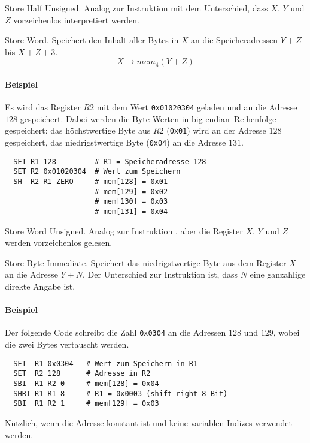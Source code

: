 \glqq Store Half Unsigned\grqq.
Analog zur Instruktion  mit dem Unterschied, dass $X$, $Y$ und $Z$
vorzeichenlos interpretiert werden.


\glqq Store Word\grqq.
Speichert den Inhalt aller Bytes in $X$ an die Speicheradressen $Y + Z$ bis 
$X + Z + 3$.
\[
    X \to mem_{4}(Y + Z)
\]
\paragraph{Beispiel}
Es wird das Register $R2$ mit dem Wert \texttt{0x01020304} geladen und an die
Adresse $128$ gespeichert. Dabei werden die Byte-Werten in 
\glqq big-endian\grqq\ Reihenfolge gespeichert: das höchstwertige Byte aus $R2$
(\texttt{0x01}) wird an der Adresse $128$ gespeichert, das niedrigstwertige
Byte (\texttt{0x04}) an die Adresse $131$.

\begin{lstlisting}
  SET R1 128         # R1 = Speicheradresse 128
  SET R2 0x01020304  # Wert zum Speichern
  SH  R2 R1 ZERO     # mem[128] = 0x01
                     # mem[129] = 0x02
                     # mem[130] = 0x03
                     # mem[131] = 0x04
\end{lstlisting}


\glqq Store Word Unsigned\grqq.
Analog zur Instruktion , aber die Register $X$, $Y$ und $Z$ werden
vorzeichenlos gelesen.



\glqq Store Byte Immediate\grqq.
Speichert das niedrigstwertige Byte aus dem Register $X$ an die Adresse $Y + N$.
Der Unterschied zur Instruktion  ist, dass $N$ eine ganzahlige
direkte Angabe ist.

\paragraph{Beispiel}
Der folgende Code schreibt die Zahl \texttt{0x0304} an die Adressen $128$ und
$129$, wobei die zwei Bytes vertauscht werden.
\begin{lstlisting}
  SET  R1 0x0304   # Wert zum Speichern in R1
  SET  R2 128      # Adresse in R2
  SBI  R1 R2 0     # mem[128] = 0x04
  SHRI R1 R1 8     # R1 = 0x0003 (shift right 8 Bit)
  SBI  R1 R2 1     # mem[129] = 0x03
\end{lstlisting}
Nützlich, wenn die Adresse konstant ist und keine variablen Indizes verwendet
werden.


